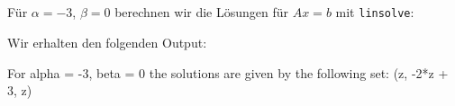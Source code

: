 \subsection{}

Für $\alpha = -3$, $\beta = 0$ berechnen wir die Lösungen für $Ax = b$ mit \texttt{linsolve}:



Wir erhalten den folgenden Output:

\begin{consoleoutput}
For alpha = -3, beta = 0 the solutions are given by the following set:
{(z, -2*z + 3, z)}
\end{consoleoutput}











